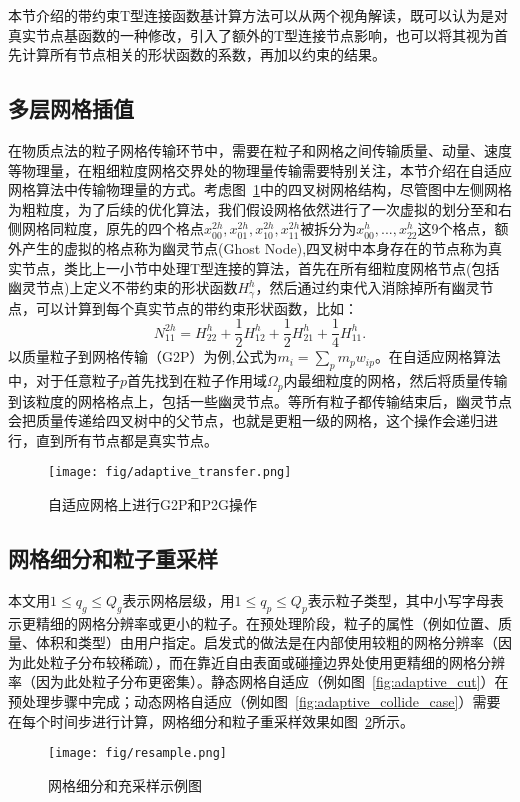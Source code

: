 本节介绍的带约束T型连接函数基计算方法可以从两个视角解读，既可以认为是对真实节点基函数的一种修改，引入了额外的T型连接节点影响，也可以将其视为首先计算所有节点相关的形状函数的系数，再加以约束的结果。

\subsection{多层网格插值}
在物质点法的粒子网格传输环节中，需要在粒子和网格之间传输质量、动量、速度等物理量，在粗细粒度网格交界处的物理量传输需要特别关注，本节介绍在自适应网格算法中传输物理量的方式。考虑图~\ref{fig:adaptive_transfer}中的四叉树网格结构，尽管图中左侧网格为粗粒度，为了后续的优化算法，我们假设网格依然进行了一次虚拟的划分至和右侧网格同粒度，原先的四个格点$x_{00}^{2h},x_{01}^{2h},x_{10}^{2h},x_{11}^{2h}$被拆分为$x_{00}^h,...,x_{22}^{h}$这9个格点，额外产生的虚拟的格点称为幽灵节点(Ghost Node),四叉树中本身存在的节点称为真实节点，类比上一小节中处理T型连接的算法，首先在所有细粒度网格节点(包括幽灵节点)上定义不带约束的形状函数$H_{\gamma}^h$，然后通过约束代入消除掉所有幽灵节点，可以计算到每个真实节点的带约束形状函数，比如：
\begin{equation}
    N_{11}^{2h}=H_{22}^{h}+\frac{1}{2}H_{12}^{h}+\frac{1}{2}H_{21}^{h}+\frac{1}{4}H_{11}^{h}.
\end{equation}
以质量粒子到网格传输（G2P）为例,公式为$m_i=\sum_pm_pw_{ip}$。在自适应网格算法中，对于任意粒子$p$首先找到在粒子作用域$\Omega_p$内最细粒度的网格，然后将质量传输到该粒度的网格格点上，包括一些幽灵节点。等所有粒子都传输结束后，幽灵节点会把质量传递给四叉树中的父节点，也就是更粗一级的网格，这个操作会递归进行，直到所有节点都是真实节点。

\begin{figure}[H]
    \centering
    \texttt{[image: fig/adaptive\_transfer.png]}
    \caption{自适应网格上进行G2P和P2G操作}
    \label{fig:adaptive_transfer}
\end{figure}

\subsection{网格细分和粒子重采样}
本文用\(1 \leq q_g \leq Q_g\)表示网格层级，用\(1 \leq q_p \leq Q_p\)表示粒子类型，其中小写字母表示更精细的网格分辨率或更小的粒子。在预处理阶段，粒子的属性（例如位置、质量、体积和类型）由用户指定。启发式的做法是在内部使用较粗的网格分辨率（因为此处粒子分布较稀疏），而在靠近自由表面或碰撞边界处使用更精细的网格分辨率（因为此处粒子分布更密集）。静态网格自适应（例如图~\ref{fig:adaptive_cut}）在预处理步骤中完成；动态网格自适应（例如图~\ref{fig:adaptive_collide_case}）需要在每个时间步进行计算，网格细分和粒子重采样效果如图~\ref{fig:resample}所示。
\begin{figure}[H]
    \centering
    \texttt{[image: fig/resample.png]}
    \caption{网格细分和充采样示例图}
    \label{fig:resample}
\end{figure}

